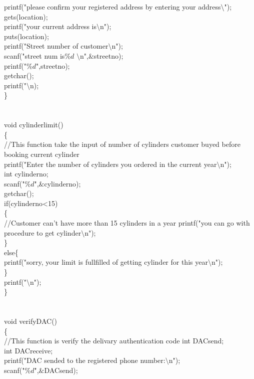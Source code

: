 \documentclass{article}
\begin{document}
{	printf("please confirm your registered address by entering your address$\setminus$");\\
	gets(location);\\
	printf("your current address is$\setminus$n");\\
	puts(location);\\
	printf("Street number of customer$\setminus$n");\\
	scanf("street num is$\%d$ $\setminus$n",$\&$streetno);\\
	printf("$\%d$",streetno);\\	
	getchar();\\
	printf("$\setminus$n);\\
\}\\
\\
\\
void cylinderlimit()\\
\{\\
	//This function take the input of number of cylinders customer buyed before booking current cylinder\\
	printf("Enter the number of cylinders you ordered in the current year$\setminus$n");\\
	int cylinderno;\\
	scanf("$\%d$",$\&$cylinderno);\\
	getchar();\\
	if(cylinderno<15)\\
	\{\\
		//Customer can't have more than 15 cylinders in a year
		printf("you can go with procedure to get cylinder$\setminus$n");\\
	\}\\
	else\{\\
		printf("sorry, your limit is fullfilled of getting cylinder for this year$\setminus$n");\\
	\}\\
	printf("$\setminus$n");\\
\}\\
\\
\\
 void verifyDAC()\\
 \{\\
 	//This function is verify the delivary authentication code
 int DACsend;\\
 int DACreceive;\\
 printf("DAC sended to the registered phone number:$\setminus$n");\\
 scanf("$\%d$",$\&$DACsend);\\
}
\end{document}
